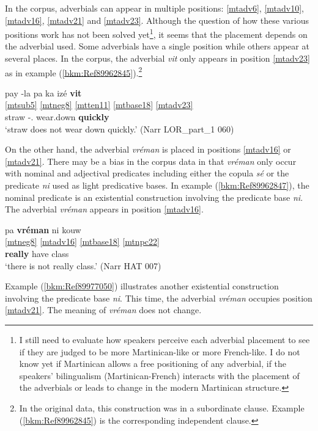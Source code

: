 \documentclass[output=paper]{langscibook}
\begin{document}
In the corpus, adverbials can appear in multiple positions: \ref{mtadv6}, \ref{mtadv10}, \ref{mtadv16}, \ref{mtadv21} and \ref{mtadv23}. Although the question of how these various positions work has not been solved yet\footnote{I still need to evaluate how speakers perceive each adverbial placement to see if they are judged to be more Martinican-like or more French-like. I do not know yet if Martinican allows a free positioning of any adverbial, if the speakers’ bilingualism (Martinican-French) interacts with the placement of the adverbials or leads to change in the modern Martinican structure.}, it seems that the placement depends on the adverbial used. Some adverbials have a single position while others appear at several places. In the corpus, the adverbial \textit{vit} only appears in position \ref{mtadv23} as in example (\ref{bkm:Ref89962845}).\footnote{In the original data, this construction was in a subordinate clause. Example (\ref{bkm:Ref89962845}) is the corresponding independent clause.}

\ea\label{bkm:Ref89962845}
\glll pay -la pa ka izé \textbf{vit}\\
\ref{mtsub5} {} \ref{mtneg8} \ref{mtten11} \ref{mtbase18} \ref{mtadv23} \\ 
straw -\Def.\Art{} \Neg{} \Impf{} wear.down \textbf{quickly}\\
\glt `straw does not wear down quickly.' (Narr LOR\_part\_1 060)
\z

On the other hand, the adverbial \textit{vréman} is placed in positions \ref{mtadv16} or \ref{mtadv21}. There may be a bias in the corpus data in that \textit{vréman} only occur with nominal and adjectival predicates including either the copula \textit{sé} or the predicate \textit{ni} used as light predicative bases. In example (\ref{bkm:Ref89962847}), the nominal predicate is an existential construction involving the predicate base \textit{ni}. The adverbial \textit{vréman} appears in position \ref{mtadv16}. 

\ea\label{bkm:Ref89962847}
\glll pa \textbf{vréman} ni kouw\\
\ref{mtneg8} \ref{mtadv16} \ref{mtbase18} \ref{mtnpc22} \\ 
\Neg{} \textbf{really} have class\\
\glt `there is not really class.' (Narr HAT 007)
\z

Example (\ref{bkm:Ref89977050}) illustrates another existential construction involving the predicate base \textit{ni}. This time, the adverbial \textit{vréman} occupies position \ref{mtadv21}. The meaning of \textit{vréman} does not change.
\end{document}
